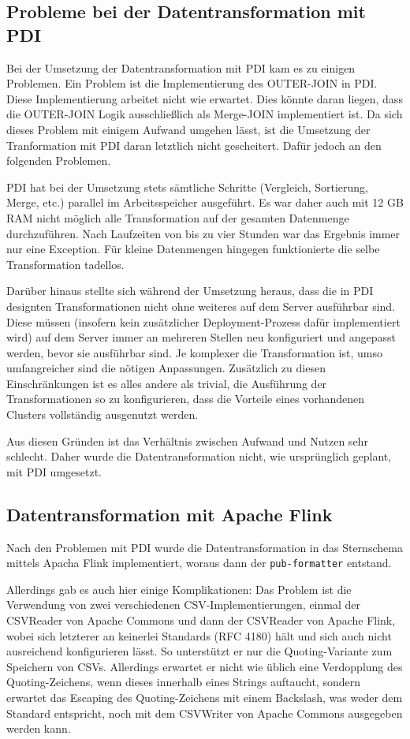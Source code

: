 \documentclass[a4paper,11pt,utf8]{scrartcl}
\begin{document}
\subsection{Probleme bei der Datentransformation mit PDI}

Bei der Umsetzung der Datentransformation mit PDI kam es zu einigen Problemen. Ein Problem ist die Implementierung des OUTER-JOIN in PDI. Diese Implementierung arbeitet nicht wie erwartet. Dies könnte daran liegen, dass die OUTER-JOIN Logik ausschließlich als Merge-JOIN implementiert ist. Da sich dieses Problem mit einigem Aufwand umgehen lässt, ist die Umsetzung der Tranformation mit PDI daran letztlich nicht gescheitert. Dafür jedoch an den folgenden Problemen.

PDI hat bei der Umsetzung stets sämtliche Schritte (Vergleich, Sortierung, Merge, etc.) parallel im Arbeitsspeicher ausgeführt. Es war daher auch mit 12 GB RAM nicht möglich alle Transformation auf der gesamten Datenmenge durchzuführen. Nach Laufzeiten von bis zu vier Stunden war das Ergebnis immer nur eine Exception. Für kleine Datenmengen hingegen funktionierte die selbe Transformation tadellos.

Darüber hinaus stellte sich während der Umsetzung heraus, dass die in PDI designten Transformationen nicht ohne weiteres auf dem Server ausführbar sind. Diese müssen (insofern kein zusätzlicher Deployment-Prozess dafür implementiert wird) auf dem Server immer an mehreren Stellen neu konfiguriert und angepasst werden, bevor sie ausführbar sind. Je komplexer die Transformation ist, umso umfangreicher sind die nötigen Anpassungen. Zusätzlich zu diesen Einschränkungen ist es alles andere als trivial, die Ausführung der Transformationen so zu konfigurieren, dass die Vorteile eines vorhandenen Clusters vollständig ausgenutzt werden.

Aus diesen Gründen ist das Verhältnis zwischen Aufwand und Nutzen sehr schlecht. Daher wurde die Datentransformation nicht, wie ursprünglich geplant, mit PDI umgesetzt.

\subsection{Datentransformation mit Apache Flink}

Nach den Problemen mit PDI wurde die Datentransformation in das Sternschema mittels Apacha Flink implementiert, woraus dann der \texttt{pub-formatter} entstand.

Allerdings gab es auch hier einige Komplikationen: Das Problem ist die Verwendung von zwei verschiedenen CSV-Implementierungen, einmal der CSVReader von Apache Commons und dann der CSVReader von Apache Flink, wobei sich letzterer an keinerlei Standards (RFC 4180) hält und sich auch nicht ausreichend konfigurieren lässt. So unterstützt er nur die Quoting-Variante zum Speichern von CSVs. Allerdings erwartet er nicht wie üblich eine Verdopplung des Quoting-Zeichens, wenn dieses innerhalb eines Strings auftaucht, sondern erwartet das Escaping des Quoting-Zeichens mit einem Backslash, was weder dem Standard entspricht, noch mit dem CSVWriter von Apache Commons ausgegeben werden kann.
\end{document}
